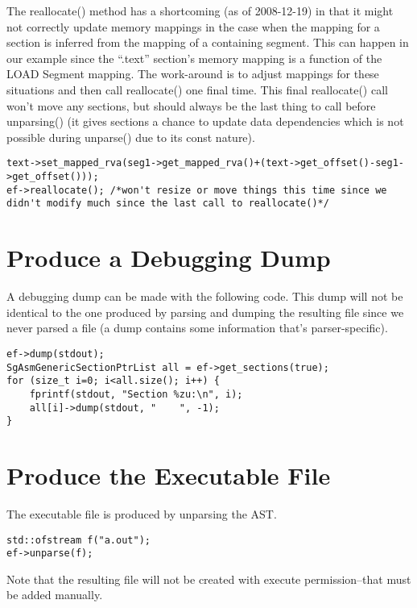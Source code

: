 The reallocate() method has a shortcoming (as of 2008-12-19) in that
it might not correctly update memory mappings in the case when the
mapping for a section is inferred from the mapping of a containing
segment. This can happen in our example since the ``.text'' section's
memory mapping is a function of the LOAD Segment mapping. The
work-around is to adjust mappings for these situations and then call
reallocate() one final time. This final reallocate() call won't move
any sections, but should always be the last thing to call before
unparsing() (it gives sections a chance to update data dependencies
which is not possible during unparse() due to its const nature).

\begin{verbatim}
text->set_mapped_rva(seg1->get_mapped_rva()+(text->get_offset()-seg1->get_offset()));
ef->reallocate(); /*won't resize or move things this time since we didn't modify much since the last call to reallocate()*/
\end{verbatim}

\section{Produce a Debugging Dump}

A debugging dump can be made with the following code. This dump will
not be identical to the one produced by parsing and dumping the
resulting file since we never parsed a file (a dump contains some
information that's parser-specific).

\begin{verbatim}
ef->dump(stdout);
SgAsmGenericSectionPtrList all = ef->get_sections(true);
for (size_t i=0; i<all.size(); i++) {
    fprintf(stdout, "Section %zu:\n", i);
    all[i]->dump(stdout, "    ", -1);
}
\end{verbatim}

\section{Produce the Executable File}

The executable file is produced by unparsing the AST.

\begin{verbatim}
std::ofstream f("a.out");
ef->unparse(f);
\end{verbatim}

Note that the resulting file will not be created with execute
permission--that must be added manually.
